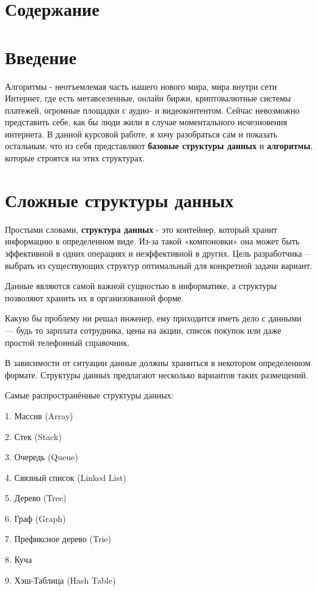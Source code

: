 \documentclass[utf8,14pt,a4paper,oneside,russian]{book}
\makeatletter
\renewcommand{\tableofcontents}{\section*{Содержание}\markboth{Содержание}{}\@starttoc{toc}\newpage}
\makeatother
\begin{document}
	\tableofcontents
	
	\section{Введение}
	
	Алгоритмы - неотъемлемая часть нашего нового мира, мира внутри сети Интернет, где есть метавселенные, онлайн биржи, криптовалютные системы платежей, огромные площадки с аудио- и видеоконтентом. Сейчас невозможно представить себе, как бы люди жили в случае моментального исчезновения интернета. В данной курсовой работе, я хочу разобраться сам и показать остальным, что из себя представляют \textbf{базовые структуры данных} и \textbf{алгоритмы}, которые строятся на этих структурах.
	
	\newpage
	\section{Сложные структуры данных}
	
	Простыми словами, \textbf{структура данных} - это контейнер, который хранит информацию в определенном виде. Из-за такой «компоновки» она может быть эффективной в одних операциях и неэффективной в других. Цель разработчика – выбрать из существующих структур оптимальный для конкретной задачи вариант.
	
	Данные являются самой важной сущностью в информатике, а структуры позволяют хранить их в организованной форме.
	
	Какую бы проблему ни решал инженер, ему приходится иметь дело с данными — будь то зарплата сотрудника, цены на акции, список покупок или даже простой телефонный справочник.
	
	В зависимости от ситуации данные должны храниться в некотором определенном формате. Структуры данных предлагают несколько вариантов таких размещений.
	
	Самые распространённые структуры данных:
	
	
	1. Массив (Array)
	
	2. Стек (Stack)
	
	3. Очередь (Queue)
	
	4. Связный список (Linked List)
	
	5. Дерево (Tree)
	
	6. Граф (Graph)
	
	7. Префиксное дерево (Trie)
	
	8. Куча
	
	9. Хэш-Таблица (Hash Table)
	
\end{document}

